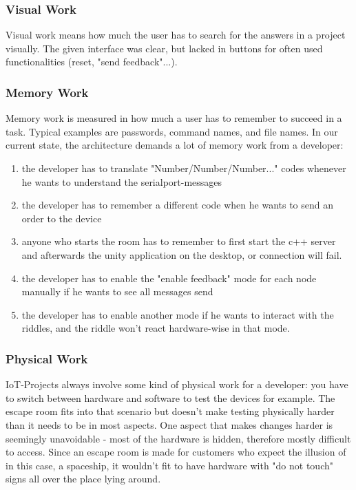 \subsubsection{Visual Work}
Visual work means how much the user has to search for the answers in a project visually.
The given interface was clear, but lacked in buttons for often used functionalities (reset, "send feedback"...).

\subsubsection{Memory Work}
Memory work is measured in how much a user has to remember to succeed in a task. 
Typical examples are passwords, command names, and file names.
In our current state, the architecture demands a lot of memory work from a developer:
\begin{enumerate}
    \item the developer has to translate "Number/Number/Number..." codes whenever he wants to understand the serialport-messages 
    \item the developer has to remember a different code when he wants to send an order to the device
    \item anyone who starts the room has to remember to first start the c++ server and afterwards the unity application on the desktop, or connection will fail.
    \item the developer has to enable the "enable feedback" mode for each node manually if he wants to see all messages send
    \item the developer has to enable another mode if he wants to interact with the riddles, and the riddle won't react hardware-wise in that mode.
\end{enumerate} 

\subsubsection{Physical Work}
IoT-Projects always involve some kind of physical work for a developer: you have to switch between hardware and software to test the devices for example.
The escape room fits into that scenario but doesn't make testing physically harder than it needs to be in most aspects. 
One aspect that makes changes harder is seemingly unavoidable - most of the hardware is hidden, therefore mostly difficult to access. 
Since an escape room is made for customers who expect the illusion of in this case, a spaceship, 
it wouldn't fit to have hardware with "do not touch" signs all over the place lying around.

